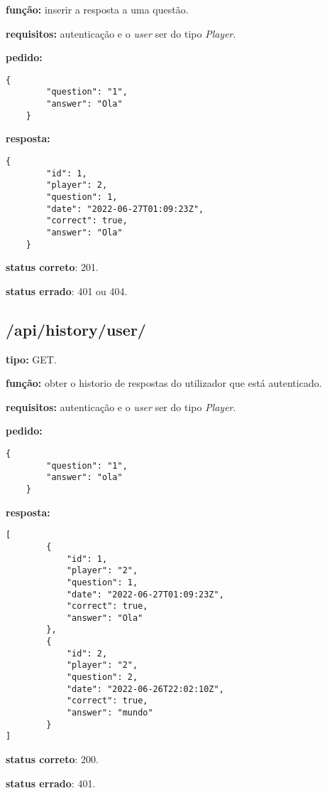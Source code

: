 \documentclass[11pt,a4paper]{report}
\begin{document}
\textbf{função:} inserir a resposta a uma questão.

\textbf{requisitos:} autenticação e o \emph{user} ser do tipo \emph{Player}.

\textbf{pedido:}
\begin{lstlisting}[style = code]
    {
        "question": "1",
        "answer": "Ola"
    }
\end{lstlisting}

\textbf{resposta:}

\begin{lstlisting}[style = code]
    {
        "id": 1,
        "player": 2,
        "question": 1,
        "date": "2022-06-27T01:09:23Z",
        "correct": true,
        "answer": "Ola"
    }
\end{lstlisting}

\textbf{status correto}: 201.

\textbf{status errado}: 401 ou 404.

\newpage

\subsection{/api/history/user/}

\textbf{tipo:} GET.

\textbf{função:} obter o historio de respostas do utilizador que está autenticado.

\textbf{requisitos:} autenticação e o \emph{user} ser do tipo \emph{Player}.

\textbf{pedido:}
\begin{lstlisting}[style = code]
    {
        "question": "1",
        "answer": "ola"
    }
\end{lstlisting}

\textbf{resposta:}

\begin{lstlisting}[style = code]
    [
        {
            "id": 1,
            "player": "2",
            "question": 1,
            "date": "2022-06-27T01:09:23Z",
            "correct": true,
            "answer": "Ola"
        },
        {
            "id": 2,
            "player": "2",
            "question": 2,
            "date": "2022-06-26T22:02:10Z",
            "correct": true,
            "answer": "mundo"
        }
]
\end{lstlisting}

\textbf{status correto}: 200.

\textbf{status errado}: 401.
\end{document}
